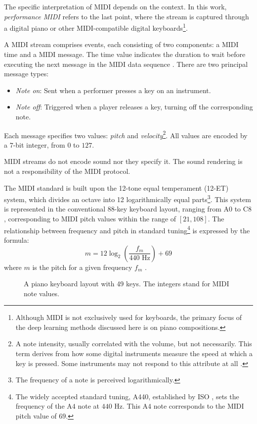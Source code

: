 The specific interpretation of MIDI depends on the context. In this work, \emph{performance MIDI} refers to the last point, where the stream is captured through a digital piano or other MIDI-compatible digital keyboards\footnote{Although MIDI is not exclusively used for keyboards, the primary focus of the deep learning methods discussed here is on piano compositions.}.

A MIDI stream comprises events, each consisting of two components: a MIDI time and a MIDI message. The time value indicates the duration to wait before executing the next message in the MIDI data sequence \cite[p.~3]{Oliveira2017}. There are two principal message types:
\begin{itemize}
\item \emph{Note on}: Sent when a performer presses a key on an instrument.
\item \emph{Note off}: Triggered when a player releases a key, turning off the corresponding note.
\end{itemize}

Each message specifies two values: \emph{pitch} and \emph{velocity}\footnote{A note intensity, usually correlated with the volume, but not necessarily. This term derives from how some digital instruments measure the speed at which a key is pressed. Some instruments may not respond to this attribute at all \cite[p.~22]{Huber2007}.}. All values are encoded by a $7$-bit integer, from $0$ to $127$.

MIDI streams do not encode sound nor they specify it. The sound rendering is not a responsibility of the MIDI protocol.

The MIDI standard is built upon the 12-tone equal temperament (12-ET) system, which divides an octave into 12 logarithmically equal parts\footnote{The frequency of a note is perceived logarithmically.}. This system is represented in the conventional 88-key keyboard layout, ranging from $\textrm{A}0$ to $\textrm{C}8$, corresponding to MIDI pitch values within the range of $[21, 108]$. The relationship between frequency and pitch in standard tuning\footnote{The widely accepted standard tuning, A440, established by ISO \cite{ISO1975}, sets the frequency of the $\textrm{A}4$ note at $440$ Hz. This $\textrm{A}4$ note corresponds to the MIDI pitch value of $69$.} is expressed by the formula: \[m = 12 \log_2\left(\frac{f_m}{440\textrm{ Hz}}\right) + 69\] where $m$ is the pitch for a given frequency $f_m$ \cite[p.~47--48]{MIDI1996}.

\begin{figure}[ht!]
\centering
\resizebox{1.0\linewidth}{!}{

}
\caption[A piano keyboard layout with 49 keys.]{A piano keyboard layout with 49 keys. The integers stand for MIDI note values.}
\end{figure}

